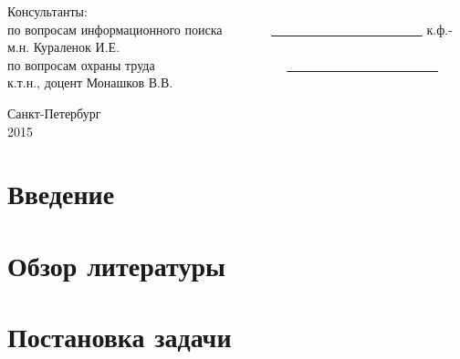 \documentclass[12pt,a4paper]{report}
\renewcommand{\contentsname}{Содержание}
\begin{document}
\begin{titlepage}
\begin{center}
\vspace*{0.3cm}

\begin{flushleft}
Консультанты:\\
\vspace*{0.3cm}
по вопросам информационного поиска \ \ \ \ \ \ \ \underline{ \ \ \ \ \ \ \ \ \ \ \ \ \ \ \ \ \ \ \ \ \ \ \ } к.ф.-м.н. Кураленок И.Е.\\
\vspace*{0.3cm}
по вопросам охраны труда \ \ \ \ \ \ \ \ \ \ \ \ \ \ \ \ \ \ \ \ \underline{ \ \ \ \ \ \ \ \ \ \ \ \ \ \ \ \ \ \ \ \ \ \ \ } к.т.н., доцент Монашков В.В.
\end{flushleft}

\end{center}
\vfill
\begin{center}
{\large Санкт-Петербург \\ 2015}
\end {center}
\end{titlepage}


\topmargin -1cm
\hoffset -0.7in
\textwidth 6.0in
\textheight 9.0in
\parindent 1cm

\makeatletter
{}
\apptocmd{\@makechapterhead}{}{}{}
\makeatother

\setcounter{tocdepth}{4}
\normalsize

\renewcommand{\contentsname}{Содержание}
\tableofcontents

\chapter*{Введение}



\chapter{Обзор литературы}



\chapter{Постановка задачи}
\end{document}
